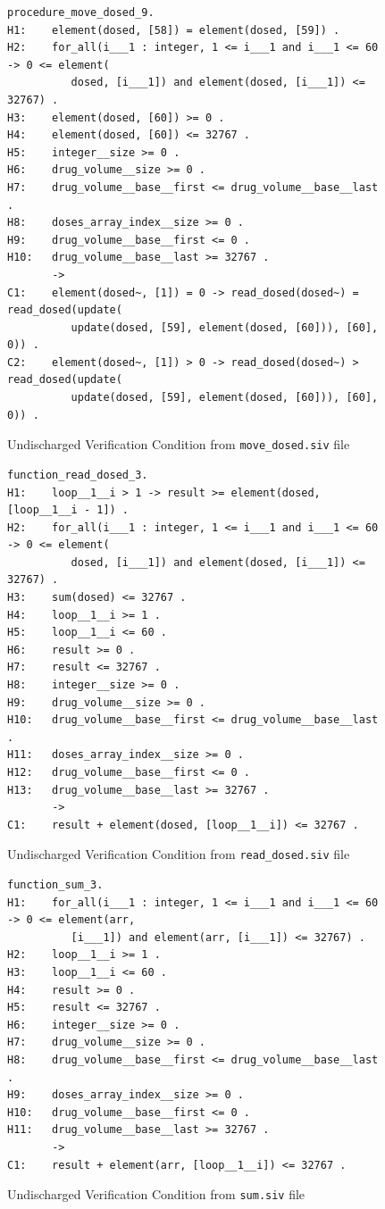 \begin{figure}
\singlespacing
\begin{lstlisting}[frame=single, gobble=0]
procedure_move_dosed_9.
H1:    element(dosed, [58]) = element(dosed, [59]) .
H2:    for_all(i___1 : integer, 1 <= i___1 and i___1 <= 60 -> 0 <= element(
          dosed, [i___1]) and element(dosed, [i___1]) <= 32767) .
H3:    element(dosed, [60]) >= 0 .
H4:    element(dosed, [60]) <= 32767 .
H5:    integer__size >= 0 .
H6:    drug_volume__size >= 0 .
H7:    drug_volume__base__first <= drug_volume__base__last .
H8:    doses_array_index__size >= 0 .
H9:    drug_volume__base__first <= 0 .
H10:   drug_volume__base__last >= 32767 .
       ->
C1:    element(dosed~, [1]) = 0 -> read_dosed(dosed~) = read_dosed(update(
          update(dosed, [59], element(dosed, [60])), [60], 0)) .
C2:    element(dosed~, [1]) > 0 -> read_dosed(dosed~) > read_dosed(update(
          update(dosed, [59], element(dosed, [60])), [60], 0)) .
\end{lstlisting}
\doublespacing
\caption{Undischarged Verification Condition from \lstinline{move_dosed.siv} file}
\label{listing:pcapump_undischarged_vc_move_dosed}
\end{figure}

\begin{figure}
\singlespacing
\begin{lstlisting}[frame=single, gobble=0]
function_read_dosed_3.
H1:    loop__1__i > 1 -> result >= element(dosed, [loop__1__i - 1]) .
H2:    for_all(i___1 : integer, 1 <= i___1 and i___1 <= 60 -> 0 <= element(
          dosed, [i___1]) and element(dosed, [i___1]) <= 32767) .
H3:    sum(dosed) <= 32767 .
H4:    loop__1__i >= 1 .
H5:    loop__1__i <= 60 .
H6:    result >= 0 .
H7:    result <= 32767 .
H8:    integer__size >= 0 .
H9:    drug_volume__size >= 0 .
H10:   drug_volume__base__first <= drug_volume__base__last .
H11:   doses_array_index__size >= 0 .
H12:   drug_volume__base__first <= 0 .
H13:   drug_volume__base__last >= 32767 .
       ->
C1:    result + element(dosed, [loop__1__i]) <= 32767 .
\end{lstlisting}
\doublespacing
\caption{Undischarged Verification Condition from \lstinline{read_dosed.siv} file}
\label{listing:pcapump_undischarged_vc_read_dosed}
\end{figure}

\begin{figure}
\singlespacing
\begin{lstlisting}[frame=single, gobble=0]
function_sum_3.
H1:    for_all(i___1 : integer, 1 <= i___1 and i___1 <= 60 -> 0 <= element(arr, 
          [i___1]) and element(arr, [i___1]) <= 32767) .
H2:    loop__1__i >= 1 .
H3:    loop__1__i <= 60 .
H4:    result >= 0 .
H5:    result <= 32767 .
H6:    integer__size >= 0 .
H7:    drug_volume__size >= 0 .
H8:    drug_volume__base__first <= drug_volume__base__last .
H9:    doses_array_index__size >= 0 .
H10:   drug_volume__base__first <= 0 .
H11:   drug_volume__base__last >= 32767 .
       ->
C1:    result + element(arr, [loop__1__i]) <= 32767 .
\end{lstlisting}
\doublespacing
\caption{Undischarged Verification Condition from \lstinline{sum.siv} file}
\label{listing:pcapump_undischarged_vc_sum}
\end{figure}

